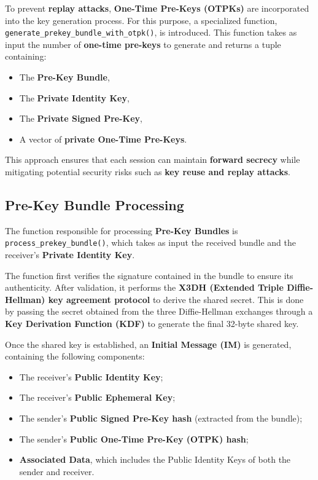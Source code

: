 To prevent \textbf{replay attacks}, \textbf{One-Time Pre-Keys (OTPKs)} are incorporated into the key generation process. For this purpose, a specialized function, \\ \texttt{generate\_prekey\_bundle\_with\_otpk()}, is introduced. This function takes as input the number of \textbf{one-time pre-keys} to generate and returns a tuple containing:
\begin{itemize}
    \item The \textbf{Pre-Key Bundle},
    \item The \textbf{Private Identity Key},
    \item The \textbf{Private Signed Pre-Key},
    \item A vector of \textbf{private One-Time Pre-Keys}.
\end{itemize}

This approach ensures that each session can maintain \textbf{forward secrecy} while mitigating potential security risks such as \textbf{key reuse and replay attacks}.

\subsection{Pre-Key Bundle Processing}
\label{subsec:Pre-KeyBundleProcessing}

The function responsible for processing \textbf{Pre-Key Bundles} is \texttt{process\_prekey\_bundle()}, which takes as input the received bundle and the receiver's \textbf{Private Identity Key}.

The function first verifies the signature contained in the bundle to ensure its authenticity. After validation, it performs the \textbf{X3DH (Extended Triple Diffie-Hellman) key agreement protocol} to derive the shared secret. This is done by passing the secret obtained from the three Diffie-Hellman exchanges through a \textbf{Key Derivation Function (KDF)} to generate the final 32-byte shared key.  

Once the shared key is established, an \textbf{Initial Message (IM)} is generated, containing the following components:  

\begin{itemize}  
    \item The receiver's \textbf{Public Identity Key};  
    \item The receiver's \textbf{Public Ephemeral Key};  
    \item The sender's \textbf{Public Signed Pre-Key hash} (extracted from the bundle);  
    \item The sender's \textbf{Public One-Time Pre-Key (OTPK) hash};  
    \item \textbf{Associated Data}, which includes the Public Identity Keys of both the sender and receiver.  
\end{itemize}  

